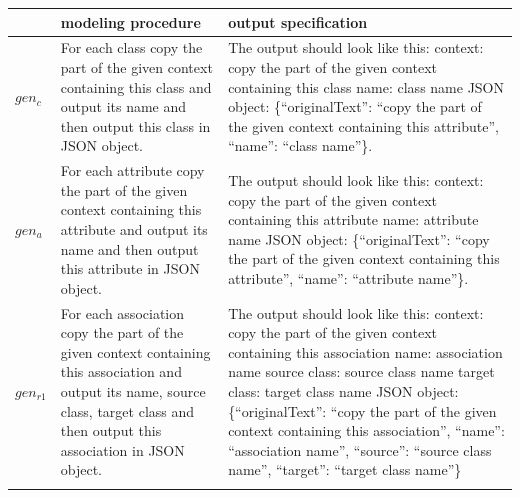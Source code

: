 
\begin{table}[!h]
    \scriptsize
    \centering
    \setlength{\tabcolsep}{0.5em}
\begin{tabular}{@{}l>{\raggedright\arraybackslash}p{}>{\raggedright\arraybackslash}p{}@{}}
         & modeling procedure & output specification \\
    \toprule
    \addlinespace
$gen_c$ & For each class copy the part of the given context containing this class and output its name and then output this class in JSON object. & The output should look like this: \newline
context: copy the part of the given context containing this class \newline
name: class name \newline
JSON object: \{``originalText'': ``copy the part of the given context containing this attribute'', ``name'': ``class name''\}. \\
\addlinespace

$gen_a$ & For each attribute copy the part of the given context containing this attribute and output its name and then output this attribute in JSON object. & The output should look like this: \newline
context: copy the part of the given context containing this attribute \newline
name: attribute name \newline
JSON object: \{``originalText'': ``copy the part of the given context containing this attribute'', ``name'': ``attribute name''\}. \\
\addlinespace

$gen_{r1}$ & For each association copy the part of the given context containing this association and output its name, source class, target class and then output this association in JSON object. &
The output should look like this: \newline
context: copy the part of the given context containing this association \newline
name: association name \newline
source class: source class name \newline
target class: target class name \newline
JSON object: \{``originalText'': ``copy the part of the given context containing this association'', ``name'': ``association name'', ``source'': ``source class name'', ``target'': ``target class name''\} \\
\addlinespace


\end{tabular}
\end{table}
